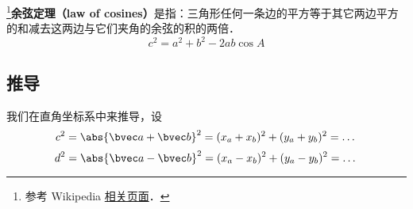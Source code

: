 
\begin{issues}
\issueDraft
\end{issues}

\footnote{参考 Wikipedia \href{https://en.wikipedia.org/wiki/Law_of_cosines}{相关页面}．}\textbf{余弦定理（law of cosines）}是指：三角形任何一条边的平方等于其它两边平方的和减去这两边与它们夹角的余弦的积的两倍．
\begin{equation}\label{CosThe_eq1}
c^2=a^2 + b^2 - 2ab\cos A
\end{equation}



\subsection{推导}
我们在直角坐标系中来推导，设
\begin{equation}
c^2 = \abs{\bvec a + \bvec b}^2 = (x_a + x_b)^2 + (y_a + y_b)^2 = \dots
\end{equation}
\begin{equation}
d^2 = \abs{\bvec a - \bvec b}^2 = (x_a - x_b)^2 + (y_a - y_b)^2 = \dots
\end{equation}
